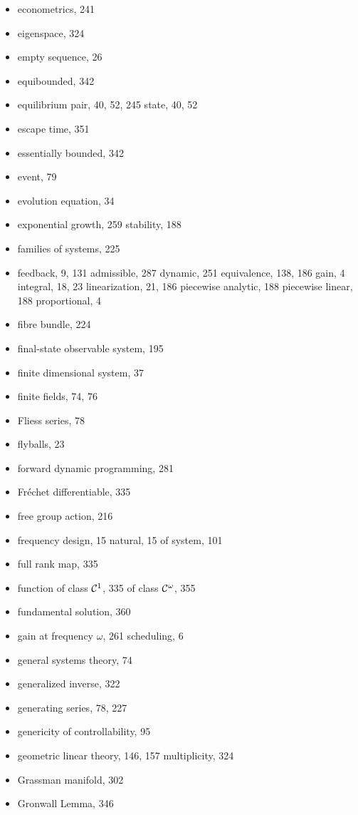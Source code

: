 \begin{itemize}
  \indexspace

  \item econometrics, 241
  \item eigenspace, 324
  \item empty sequence, 26
  \item equibounded, 342
  \item equilibrium
    \subitem pair, 40, 52, 245
    \subitem state, 40, 52
  \item escape time, 351
  \item essentially bounded, 342
  \item event, 79
  \item evolution equation, 34
  \item exponential
    \subitem growth, 259
    \subitem stability, 188

  \indexspace
  \item families of systems, 225
  \item feedback, 9, 131
    \subitem admissible, 287
    \subitem dynamic, 251
    \subitem equivalence, 138, 186
    \subitem gain, 4
    \subitem integral, 18, 23
    \subitem linearization, 21, 186
    \subitem piecewise analytic, 188
    \subitem piecewise linear, 188
    \subitem proportional, 4
  \item fibre bundle, 224
  \item final-state observable system, 195
  \item finite dimensional system, 37
  \item finite fields, 74, 76
  \item Fliess series, 78
  \item flyballs, 23
  \item forward dynamic programming, 281
  \item Fr\'echet differentiable, 335
  \item free group action, 216
  \item frequency
    \subitem design, 15
    \subitem natural, 15
    \subitem of system, 101
  \item full rank map, 335
  \item function
    \subitem of class ${\cal C}^1$, 335
    \subitem of class ${\cal C}^\omega $, 355
  \item fundamental solution, 360

  \indexspace

  \item gain
    \subitem at frequency $\omega$, 261
    \subitem scheduling, 6
  \item general systems theory, 74
  \item generalized inverse, 322
  \item generating series, 78, 227
  \item genericity of controllability, 95
  \item geometric
    \subitem linear theory, 146, 157
    \subitem multiplicity, 324
  \item Grassman manifold, 302
  \item Gronwall Lemma, 346


\end{itemize}
